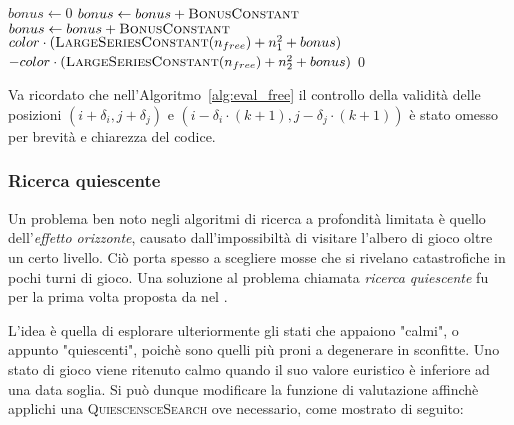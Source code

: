 \documentclass{article}
\begin{document}
\begin{algorithm}[H]
  \caption{Valutazione delle serie favorendo spazi liberi adiacenti}
  \label{alg:eval_free}
  \begin{algorithmic}[0]
    \State $bonus \gets 0$
      \State $bonus \gets bonus + \textsc{BonusConstant}$
    \EndIf
      \State $bonus \gets bonus + \textsc{BonusConstant}$
    \EndIf
    \Statex
      \State \Return $color \cdot (\Call{LargeSeriesConstant}{n_{free}} + n_1^2 + bonus)$
    \State \Return $-color \cdot (\Call{LargeSeriesConstant}{n_{free}} + n_2^2 + bonus)$
    \Else
      \State \Return $0$
    \EndIf
    \EndProcedure
  \end{algorithmic}
\end{algorithm}

Va ricordato che nell'Algoritmo~\ref{alg:eval_free} il controllo della validit\`a delle
posizioni $(i + \delta_i, j + \delta_j)$ e $(i - \delta_i \cdot (k+1), j - \delta_j \cdot (k+1))$
\`e stato omesso per brevit\`a e chiarezza del codice.

\subsubsection*{Ricerca quiescente}

Un problema ben noto negli algoritmi di ricerca a profondit\`a limitata \`e
quello dell'\emph{effetto orizzonte}, causato dall'impossibilt\`a 
di visitare l'albero di gioco oltre un certo livello. Ci\`o porta spesso a scegliere 
mosse che si rivelano catastrofiche in pochi turni di gioco. 
Una soluzione al problema chiamata \emph{ricerca quiescente} \cite{quiescence} fu per la prima
volta proposta  da \citeauthor{quiescence} nel \citeyear{quiescence}.

L'idea \`e quella di esplorare ulteriormente gli stati che appaiono "calmi", o
appunto "quiescenti", poich\`e sono quelli pi\`u proni a degenerare in sconfitte.
Uno stato di gioco viene ritenuto calmo quando il suo valore euristico \`e inferiore
ad una data soglia. Si pu\`o dunque modificare la funzione di valutazione affinch\`e
applichi una \textsc{QuiescensceSearch} ove necessario, come mostrato di seguito:
\end{document}
